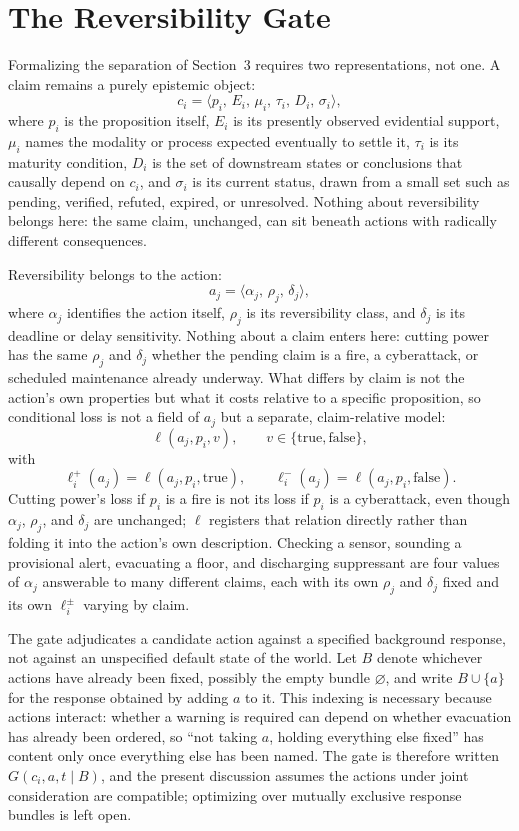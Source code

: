 \documentclass[11pt]{article}
\begin{document}
\section{The Reversibility Gate}

Formalizing the separation of Section~3 requires two representations, not one. A claim remains a purely epistemic object:
\[
c_i = \langle p_i,\, E_i,\, \mu_i,\, \tau_i,\, D_i,\, \sigma_i \rangle,
\]
where $p_i$ is the proposition itself, $E_i$ is its presently observed evidential support, $\mu_i$ names the modality or process expected eventually to settle it, $\tau_i$ is its maturity condition, $D_i$ is the set of downstream states or conclusions that causally depend on $c_i$, and $\sigma_i$ is its current status, drawn from a small set such as pending, verified, refuted, expired, or unresolved. Nothing about reversibility belongs here: the same claim, unchanged, can sit beneath actions with radically different consequences.

Reversibility belongs to the action:
\[
a_j = \langle \alpha_j,\, \rho_j,\, \delta_j \rangle,
\]
where $\alpha_j$ identifies the action itself, $\rho_j$ is its reversibility class, and $\delta_j$ is its deadline or delay sensitivity. Nothing about a claim enters here: cutting power has the same $\rho_j$ and $\delta_j$ whether the pending claim is a fire, a cyberattack, or scheduled maintenance already underway. What differs by claim is not the action's own properties but what it costs relative to a specific proposition, so conditional loss is not a field of $a_j$ but a separate, claim-relative model:
\[
\ell(a_j, p_i, v), \qquad v \in \{\mathrm{true}, \mathrm{false}\},
\]
with
\[
\ell_i^{+}(a_j) = \ell(a_j, p_i, \mathrm{true}), \qquad \ell_i^{-}(a_j) = \ell(a_j, p_i, \mathrm{false}).
\]
Cutting power's loss if $p_i$ is a fire is not its loss if $p_i$ is a cyberattack, even though $\alpha_j$, $\rho_j$, and $\delta_j$ are unchanged; $\ell$ registers that relation directly rather than folding it into the action's own description. Checking a sensor, sounding a provisional alert, evacuating a floor, and discharging suppressant are four values of $\alpha_j$ answerable to many different claims, each with its own $\rho_j$ and $\delta_j$ fixed and its own $\ell_i^{\pm}$ varying by claim.

The gate adjudicates a candidate action against a specified background response, not against an unspecified default state of the world. Let $B$ denote whichever actions have already been fixed, possibly the empty bundle $\varnothing$, and write $B \cup \{a\}$ for the response obtained by adding $a$ to it. This indexing is necessary because actions interact: whether a warning is required can depend on whether evacuation has already been ordered, so ``not taking $a$, holding everything else fixed'' has content only once everything else has been named. The gate is therefore written $G(c_i, a, t \mid B)$, and the present discussion assumes the actions under joint consideration are compatible; optimizing over mutually exclusive response bundles is left open.
\end{document}
